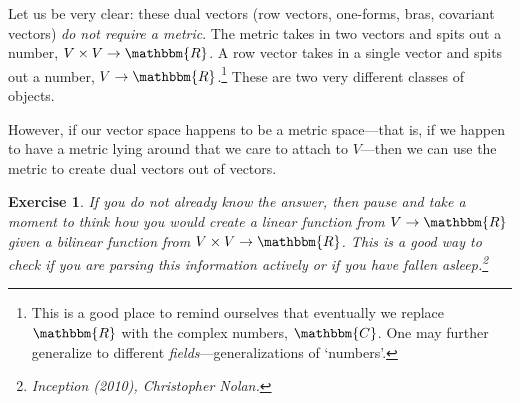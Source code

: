 \documentclass[
  11pt,
	colorful,
	raggedright,
]{tufte-style-thesis-flip}
\newtheorem{exercise}{Exercise}[section]
\begin{document}
Let us be very clear: these dual vectors (row vectors, one-forms, bras, covariant vectors) \emph{do not require a metric}. The metric takes in two vectors and spits out a number, $V\times V\to \mathbbm{R}$. A row vector takes in a single vector and spits out a number, $V\to\mathbbm{R}$.\footnote{This is a good place to remind ourselves that eventually we replace $\mathbbm{R}$ with the complex numbers, $\mathbbm{C}$. One may further generalize to different \emph{fields}---generalizations of `numbers'.} These are two very different classes of objects. 

However, if our vector space happens to be a metric space---that is, if we happen to have a metric lying around that we care to attach to $V$---then we can use the metric to create dual vectors out of vectors. 
\begin{exercise}
If you do not already know the answer, then pause and take a moment to think how you would create a linear function from $V\to \mathbbm{R}$ given a bilinear function from $V\times V\to \mathbbm{R}$. This is a good way to check if you are parsing this information actively or if you have fallen asleep.\footnote{\emph{Inception} (2010), Christopher Nolan.} 
\end{exercise}
\end{document}
